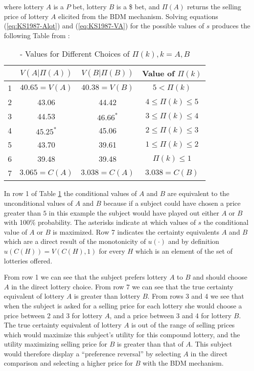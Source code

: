 \documentclass[../main.tex]{subfiles}
\begin{document}
\noindent where lottery $A$ is a $P$ bet, lottery $B$ is a {\$} bet, and $\Pi(A)$ returns the selling price of lottery $A$ elicited from the BDM mechanism.
Solving equations (\ref{eq:KS1987-Alot}) and (\ref{eq:KS1987-VA}) for the possible values of $s$ produces the following Table from \textcite[679]{Karni1987}:
\begin{table}[ht]
	\centering
	\caption{ \textcite{Karni1987} - Values for Different Choices of $\Pi(k),k = A,B$}
	\label{tb:KS1987:Pi}
	\begin{tabular}{cccc}
		   & $V(A|\Pi(A))$  & $V(B|\Pi(B))$  & Value of $\Pi(k)$      \\\hline
		1  & $40.65 = V(A)$ & $40.38 = V(B)$ & $5 < \Pi(k)$           \\
		2  & 43.06          & 44.42          & $4 \leq \Pi(k) \leq 5$ \\
		3  & 44.53          & $46.66^*$      & $3 \leq \Pi(k) \leq 4$ \\
		4  & $45.25^*$      & 45.06          & $2 \leq \Pi(k) \leq 3$ \\
		5  & 43.70          & 39.61          & $1 \leq \Pi(k) \leq 2$ \\
		6  & 39.48          & 39.48          & $\Pi(k) \leq 1$        \\\hline
		7  & $3.065 = C(A)$ & $3.038 = C(A)$ & $3.038 = C(B)$
	\end{tabular}
\end{table}

In row 1 of Table \ref{tb:KS1987:Pi} the conditional values of $A$ and $B$ are equivalent to the unconditional values of $A$ and $B$ because if a subject could have chosen a price greater than $5$ in this example the subject would have played out either $A$ or $B$ with 100\% probability.
The asterisks indicate at which values of $s$ the conditional value of $A$ or $B$ is maximized.
Row 7 indicates the certainty equivalents $A$ and $B$ which are a direct result of the monotonicity of $u(\cdot)$ and by definition $u(C(H)) = V(C(H),1)$ for every $H$ which is an element of the set of lotteries offered. 

From row 1 we can see that the subject prefers lottery $A$ to $B$ and should choose $A$ in the direct lottery choice.
From row 7 we can see that the true certainty equivalent of lottery $A$ is greater than lottery $B$.
From rows 3 and 4 we see that when the subject is asked for a selling price for each lottery she would choose a price between 2 and 3 for lottery $A$, and a price between 3 and 4 for lottery $B$.
The true certainty equivalent of lottery $A$ is out of the range of selling prices which would maximize this subject's utility for this compound lottery, and the utility maximizing selling price for $B$ is greater than that of $A$.
This subject would therefore display a \enquote{preference reversal} by selecting $A$ in the direct comparison and selecting a higher price for $B$ with the BDM mechanism.
\end{document}
